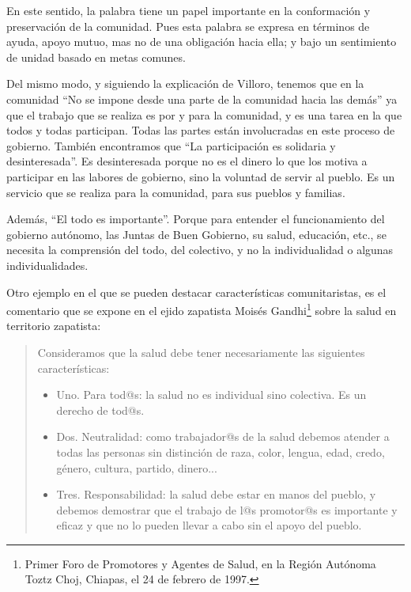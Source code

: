 \documentclass[oneside]{book}
\begin{document}
En este sentido, la palabra tiene un papel importante en la conformación y preservación de la comunidad. Pues esta palabra se expresa en términos de ayuda, apoyo mutuo, mas no de una obligación hacia ella; y bajo un sentimiento de unidad basado en metas comunes.

Del mismo modo, y siguiendo la explicación de Villoro, tenemos que en la comunidad “No se impone desde una parte de la comunidad hacia las demás” ya que el trabajo que se realiza es por y para la comunidad, y es una tarea en la que todos y todas participan. Todas las partes están involucradas en este proceso de gobierno. También encontramos que “La participación es solidaria y desinteresada”. Es desinteresada porque no es el dinero lo que los motiva a participar en las labores de gobierno, sino la voluntad de servir al pueblo. Es un servicio que se realiza para la comunidad, para sus pueblos y familias.

Además, “El todo es importante”. Porque para entender el funcionamiento del gobierno autónomo, las Juntas de Buen Gobierno, su salud, educación, etc., se necesita la comprensión del todo, del colectivo, y no la individualidad o algunas individualidades.

Otro ejemplo en el que se pueden destacar características comunitaristas, es el comentario que se expone en el ejido zapatista Moisés Gandhi\footnote{Primer Foro de Promotores y Agentes de Salud, en la Región Autónoma Toztz Choj, Chiapas, el 24 de febrero de 1997.} sobre la salud en territorio zapatista:
\begin{quote}
Consideramos que la salud debe tener necesariamente las siguientes características:
\begin{itemize}
	\item Uno. Para tod@s: la salud no es individual sino colectiva. Es un derecho de tod@s.
	\item Dos. Neutralidad: como trabajador@s de la salud debemos atender a todas las personas sin distinción de raza, color, lengua, edad, credo, género, cultura, partido, dinero...
	\item Tres. Responsabilidad: la salud debe estar en manos del pueblo, y debemos demostrar que el trabajo de l@s promotor@s es importante y eficaz y que no lo pueden llevar a cabo sin el apoyo del pueblo.
\end{itemize}
\end{quote}
	
\end{document}
